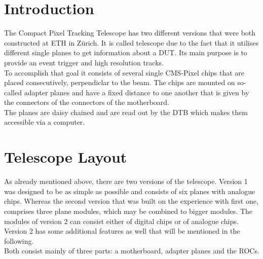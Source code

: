 \section{Introduction}\label{s20}
The Compact Pixel Tracking Telescope has two different versions that were both constructed at \ac{ETH} in Z{\"u}rich. It is called telescope due to the fact that it utilises different single planes to get information about a \ac{DUT}. Its main purpose is to provide an event trigger and high resolution tracks.\\ 
To accomplish that goal it consists of several single \ac{CMS}-Pixel chips that are placed consecutively, perpendiclar to the beam. The chips are mounted on so-called adapter planes and have a fixed distance to one another that is given by the connectors of the connectors of the motherboard.\\
The planes are daisy chained and are read out by the \ac{DTB} which makes them accessible via a computer.
\section{Telescope Layout}\label{s21}
As already mentioned above, there are two versions of the telescope. Version 1 was designed to be as simple as possible and consists of six planes with analogue chips. Whereas the second version that was built on the experience with first one, comprises three plane modules, which may be combined to bigger modules. The modules of version 2 can consist either of digital chips or of analogue chips. Version 2 has some additional features as well that will be mentioned in the following.\\
Both consist mainly of three parts: a motherboard, adapter planes and the \ac{ROC}s.

